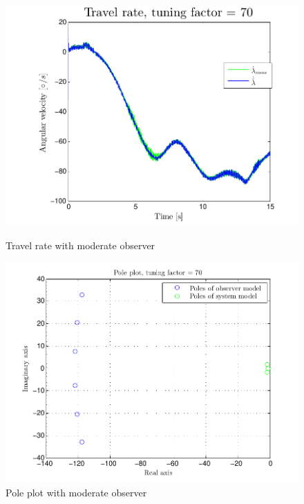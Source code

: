\begin{figure}[htb]
    \begin{minipage}{0.5\textwidth}
    	\centering
		\includegraphics[width=1\textwidth,trim={0cm 0cm 0cm 0cm},clip]{figures/P4p2_travel_rate_tuning_factor_70.pdf}
    	\caption{Travel rate with moderate observer}
        \label{fig:P4p2_travel_rate_70}
    \end{minipage}    
    \begin{minipage}{0.5\textwidth}
    	\centering
		\includegraphics[width=1\textwidth,trim={0cm 0cm 0cm 0cm},clip]{figures/P4p2_pole_plot_tuning_factor_70.pdf}
    	\caption{Pole plot with moderate observer}
        \label{fig:P4p2_pole_plot_70}
    \end{minipage}    
\end{figure}